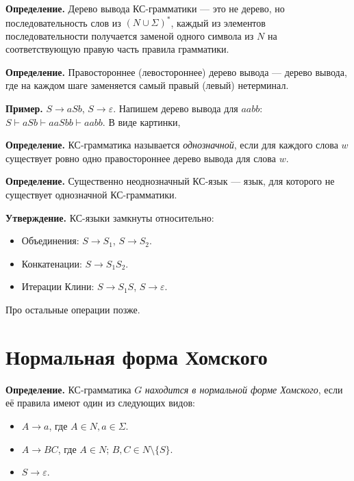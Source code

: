 \textbf{Определение.} Дерево вывода КС-грамматики --- это не дерево, но последовательность слов из $(N \cup \Sigma)^*$, каждый из элементов последовательности получается заменой одного символа из $N$ на соответствующую правую часть правила грамматики.

\textbf{Определение.} Правостороннее (левостороннее) дерево вывода --- дерево вывода, где на каждом шаге заменяется самый правый (левый) нетерминал.

\textbf{Пример.} $S \to aSb$, $S \to \varepsilon$.
Напишем дерево вывода для $aabb$: $S \vdash aSb \vdash aaSbb \vdash aabb$.
В виде картинки,


\textbf{Определение.} КС-грамматика называется \textit{однозначной}, если для каждого слова $w$ существует ровно одно правостороннее дерево вывода для слова $w$.

\textbf{Определение.} Существенно неоднозначный КС-язык --- язык, для которого не существует однозначной КС-грамматики.

\textbf{Утверждение.} КС-языки замкнуты относительно:
\begin{itemize}
    \item Объединения: $S \to S_1$, $S \to S_2$.
    \item Конкатенации: $S \to S_1S_2$.
    \item Итерации Клини: $S \to S_1S$, $S \to \varepsilon$.
\end{itemize}
Про остальные операции позже.

\section{Нормальная форма Хомского}
\textbf{Определение.} КС-грамматика $G$ \textit{находится в нормальной форме Хомского}, если её правила имеют один из следующих видов:
\begin{itemize}
    \item $A \to a$, где $A \in N, a \in \Sigma$.
    \item $A \to BC$, где $A \in N$; $B, C \in N \setminus \{S\}$.
    \item $S \to \varepsilon$.
\end{itemize}

